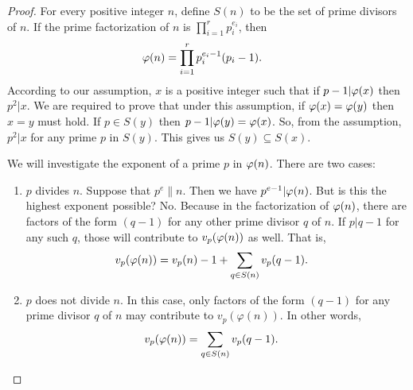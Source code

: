 \documentclass{subfile}
\begin{document}
		\begin{proof}
			For every positive integer $n$, define $S(n)$ to be the set of prime divisors of $n$. If the prime factorization of $n$ is $\prod_{i=1}^{r}p_i^{e_i}$, then
				\begin{align*}
					\varphi (n) & = \prod_{i=1}^{r}p_i^{e_i-1}(p_i-1).
				\end{align*}
			According to our assumption, $x$ is a positive integer such that if $p-1|\varphi (x)$ then $p^2|x$. We are required to prove that under this assumption, if $\varphi (x)=\varphi (y)$ then $x=y$ must hold. If $p\in S(y)$ then $p-1|\varphi (y)=\varphi (x)$. So, from the assumption, $p^2|x$ for any prime $p$ in $S(y)$. This gives us $S(y)\subseteq S(x)$.
				
			We will investigate the exponent of a prime $p$ in $\varphi (n)$. There are two cases:
				\begin{enumerate}
					\item $p$ divides $n$. Suppose that $p^e\|n$. Then we have $p^{e-1}|\varphi (n)$. But is this the highest exponent possible? No. Because in the factorization of $\varphi (n)$, there are factors of the form $(q-1)$ for any other prime divisor $q$ of $n$. If $p|q-1$ for any such $q$, those will contribute to $v_p(\varphi (n))$ as well. That is,
						\begin{align*}
							v_p(\varphi (n)) & = v_p(n)-1+\sum_{q\in S(n)}v_p(q-1).
						\end{align*}
					
					\item $p$ does not divide $n$. In this case, only factors of the form $(q-1)$ for any prime divisor $q$ of $n$ may contribute to $v_p(\varphi(n))$. In other words,
						\begin{align*}
							v_p(\varphi (n)) & = \sum_{q\in S(n)}v_p(q-1).
						\end{align*}
				\end{enumerate}


\end{proof}
\end{document}
